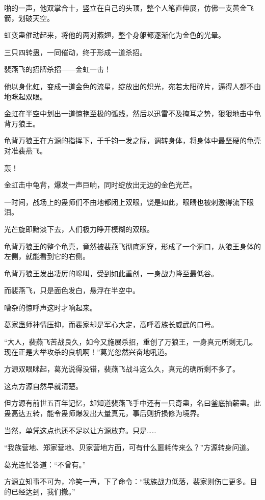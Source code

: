 \begin{this_body}
啪的一声，他双掌合十，竖立在自己的头顶，整个人笔直伸展，仿佛一支黄金飞箭，划破天空。

虹变蛊催动起来，将他的两对燕翅，整个身躯都逐渐化为金色的光晕。

三只四转蛊，一同催动，终于形成一道杀招。

裴燕飞的招牌杀招——金虹一击！

他以身化虹，变成一道金色的流星，绽放出的炽光，宛若太阳碎片，逼得人都不由地眯起双眼。

金虹在半空中划出一道惊艳至极的弧线，然后以迅雷不及掩耳之势，狠狠地击中龟背万狼王。

龟背万狼王在方源的指挥下，于千钧一发之际，调转身体，将身体中最坚硬的龟壳对准裴燕飞。

轰！

金虹击中龟背，爆发一声巨响，同时绽放出无边的金色光芒。

一时间，战场上的蛊师们不由地都闭上双眼，饶是如此，眼睛也被刺激得流下眼泪。

光芒旋即黯淡下去，人们极力睁开模糊的双眼。

龟背万狼王的整个龟壳，竟然被裴燕飞彻底洞穿，形成了一个洞口，从狼王身体的左侧，就能看到它的右侧。

龟背万狼王发出凄厉的嗥叫，受到如此重创，一身战力降至最低谷。

而裴燕飞，只是面色发白，悬浮在半空中。

嘈杂的惊呼声这时才响起来。

葛家蛊师神情压抑，而裴家却是军心大定，高呼着族长威武的口号。

“大人，裴燕飞苦战良久，如今又施展杀招，重创了万狼王，一身真元所剩无几。现在正是大举攻杀的良机啊！”葛光忽然兴奋地吼道。

方源双眼眯起，葛光说得没错，裴燕飞战斗这么久，真元的确所剩不多了。

这点方源自然早就清楚。

但方源有前世五百年记忆，却知道裴燕飞手中还有一只奇蛊，名曰釜底抽薪蛊。此蛊高达五转，能令蛊师爆发出大量真元，事后则折损修为境界。

当然，单凭这点也还不足以让方源放弃。只是……

“我族营地、郑家营地、贝家营地方面，可有什么噩耗传来么？”方源转身问道。

葛光连忙答道：“不曾有。”

方源立知事不可为，冷笑一声，下了命令：“我族战力低落，裴家则伤亡更多。目的已经达到，我们撤。”

\end{this_body}

